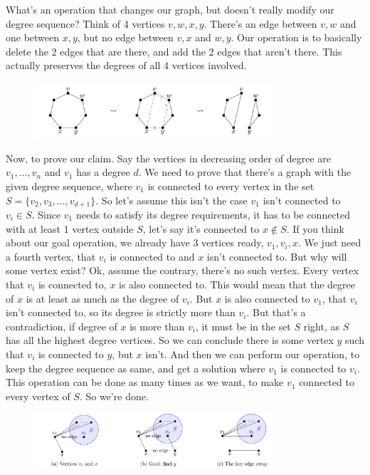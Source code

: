 \documentclass[12pt]{report}
\begin{document}
\begin{enumerate}[label=\textbf{\arabic*.}]
  What's an operation that changes our graph, but doesn't really modify our degree sequence? Think of 4 vertices $v, w, x, y$. There's an edge between $v, w$ and one 
  between $x, y$, but no edge between $v, x$ and $w, y$. Our operation is to basically delete the 2 edges that are there, and add the 2 edges that aren't there.
  This actually preserves the degrees of all 4 vertices involved.

  \begin{figure}[H]
    \centering
    \includegraphics[width=0.8\textwidth]{Edgeswap.png}  
  \end{figure}

  Now, to prove our claim. Say the vertices in decreasing order of degree are $v_1, \dots, v_n$ and $v_1$ has a degree $d$. We need to prove that there's a graph with 
  the given degree sequence, where $v_1$ is connected to every vertex in the set $S = \{v_2, v_3, \dots, v_{d+1}\}$. So let's assume this isn't the case $v_1$ isn't connected
  to $v_i \in S$. Since $v_1$ needs to satisfy its degree requirements, it has to be connected with at least 1 vertex outside $S$, let's say it's connected to $x \notin S$.
  If you think about our goal operation, we already have $3$ vertices ready, $v_1, v_i, x$. We just need a fourth vertex, that $v_i$ is connected to and $x$ isn't connected to.
  But why will some vertex exist? Ok, assume the contrary, there's no such vertex. Every vertex that $v_i$ is connected to, $x$ is also connected to. This would mean that the 
  degree of $x$ is at least as much as the degree of $v_i$. But $x$ is also connected to $v_1$, that $v_i$ isn't connected to, so its degree is strictly more than $v_i$.
  But that's a contradiction, if degree of $x$ is more than $v_i$, it must be in the set $S$ right, as $S$ has all the highest degree vertices. So we can conclude there is 
  some vertex $y$ such that $v_i$ is connected to $y$, but $x$ isn't. And then we can perform our operation, to keep the degree sequence as same, and get a solution where $v_1$ 
  is connected to $v_i$. This operation can be done as many times as we want, to make $v_1$ connected to every vertex of $S$. So we're done.

  \begin{figure}[H]
    \centering
    \includegraphics[width=0.8\textwidth]{DegSeqProof.png}  
  \end{figure}
    

\end{enumerate}
\end{document}
